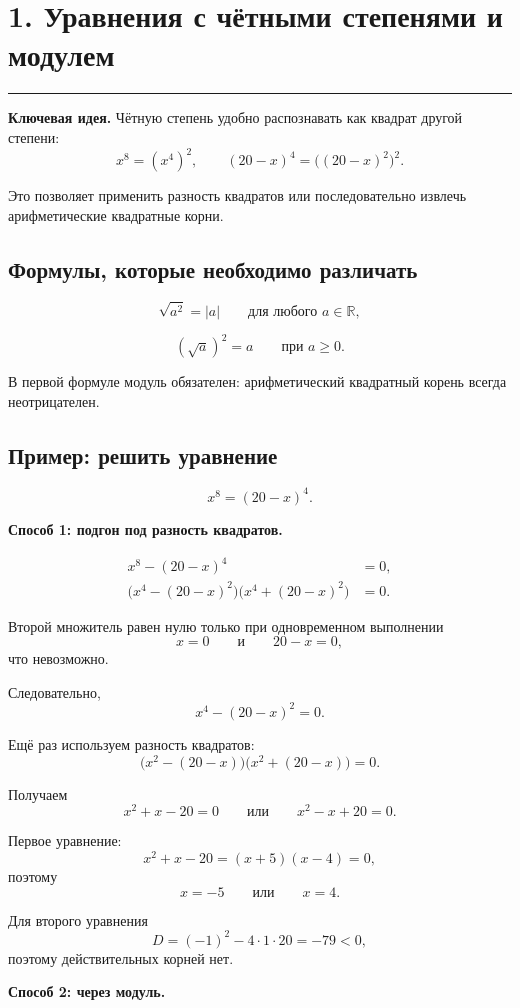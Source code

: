 \documentclass[a4paper,12pt]{article}
\newcommand{\sectionrule}{%
  \par
  \vspace{-0.35em}%
  {\color{accent}\rule{\linewidth}{0.6pt}}%
  \vspace{0.6em}%
}
\newcommand{\key}[1]{\textcolor{darkaccent}{\textbf{#1}}}
\begin{document}
\section*{1. Уравнения с чётными степенями и модулем}
\sectionrule

\key{Ключевая идея.}
Чётную степень удобно распознавать как квадрат другой степени:
\[
x^8=(x^4)^2,
\qquad
(20-x)^4=\bigl((20-x)^2\bigr)^2.
\]

Это позволяет применить разность квадратов или последовательно извлечь
арифметические квадратные корни.

\subsection*{Формулы, которые необходимо различать}

\[
\sqrt{a^2}=|a|
\qquad
\text{для любого } a\in\mathbb R,
\]

\[
(\sqrt a)^2=a
\qquad
\text{при } a\ge0.
\]

В первой формуле модуль обязателен: арифметический квадратный корень
всегда неотрицателен.

\subsection*{Пример: решить уравнение}

\[
x^8=(20-x)^4.
\]

\key{Способ 1: подгон под разность квадратов.}

\begin{align*}
x^8-(20-x)^4&=0,\\
\bigl(x^4-(20-x)^2\bigr)
\bigl(x^4+(20-x)^2\bigr)&=0.
\end{align*}

Второй множитель равен нулю только при одновременном выполнении
\[
x=0
\qquad\text{и}\qquad
20-x=0,
\]
что невозможно.

Следовательно,
\[
x^4-(20-x)^2=0.
\]

Ещё раз используем разность квадратов:
\[
\bigl(x^2-(20-x)\bigr)
\bigl(x^2+(20-x)\bigr)=0.
\]

Получаем
\[
x^2+x-20=0
\qquad\text{или}\qquad
x^2-x+20=0.
\]

Первое уравнение:
\[
x^2+x-20=(x+5)(x-4)=0,
\]
поэтому
\[
x=-5
\qquad\text{или}\qquad
x=4.
\]

Для второго уравнения
\[
D=(-1)^2-4\cdot1\cdot20=-79<0,
\]
поэтому действительных корней нет.

\key{Способ 2: через модуль.}
\end{document}
